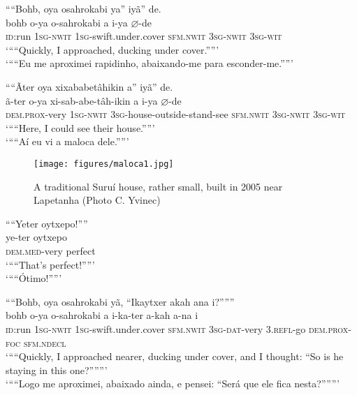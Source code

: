 \documentclass[output=paper,
modfonts,nonflat
]{langsci/langscibook}
\begin{document}
\ea ““Bohb, oya osahrokabi ya” iyã” de.\\[.3em]
\gll bohb o-ya o-sahrokabi a i-ya \(\varnothing\)-de\\
\textsc{id}:run \textsc{1sg-nwit} \textsc{1sg}-swift.under.cover \textsc{sfm.nwit} \textsc{3sg-nwit} \textsc{3sg-wit}\\
\glt ‘““Quickly, I approached, ducking under cover.””’\\
\glt ‘““Eu me aproximei rapidinho, abaixando-me para esconder-me.””’\\
\z



\ea ““Ãter oya xixababetâhikin a” iyã” de.\\[.3em]
\gll ã-ter o-ya xi-sab-abe-tâh-ikin a i-ya \(\varnothing\)-de\\
\textsc{dem.prox}-very \textsc{1sg-nwit} \textsc{3sg}-house-outside-stand-see \textsc{sfm.nwit} \textsc{3sg-nwit} \textsc{3sg-wit}\\
\glt ‘““Here, I could see their house.””’{\footnotemark}\\
\glt ‘““Aí eu vi a maloca dele.””’\\
\z


\begin{figure}
\texttt{[image: figures/maloca1.jpg]}
\caption{A traditional Suruí house, rather small, built in 2005 near Lapetanha (Photo C. Yvinec)}
\label{fig:surui:4}
\end{figure}

 

\ea ““Yeter oytxepo!””\\[.3em]
\gll ye-ter oytxepo\\
\textsc{dem.med}-very perfect\\
\glt ‘““That’s perfect!””’\\
\glt ‘““Ótimo!””’\\
\z

\ea ““Bohb, oya osahrokabi yã, “Ikaytxer akah ana i?”””\\[.3em]
\gll bohb o-ya o-sahrokabi a i-ka-ter a-kah a-na i\\
\textsc{id}:run \textsc{1sg-nwit} \textsc{1sg}-swift.under.cover \textsc{sfm.nwit} \textsc{3sg-dat}-very \textsc{3.refl}-go \textsc{dem.prox-foc} \textsc{sfm.ndecl}\\
\glt ‘““Quickly, I approached nearer, ducking under cover, and I thought: “So is he staying in this one?”””’{\footnotemark}\\
\glt ‘““Logo me aproximei, abaixado ainda, e pensei: “Será que ele fica nesta?”””’\\
\z
\end{document}

